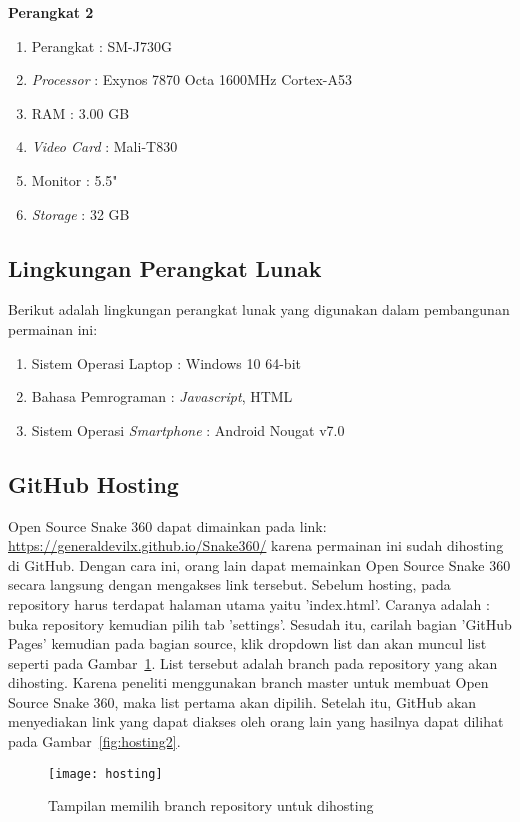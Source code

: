 \textbf{Perangkat 2}
\begin{enumerate}
	\item Perangkat : SM-J730G
	\item \textit{Processor} : Exynos 7870 Octa 1600MHz Cortex-A53
	\item RAM : 3.00 GB
	\item \textit{Video Card} : Mali-T830
	\item Monitor : 5.5"
	\item \textit{Storage} : 32 GB
\end{enumerate}

\subsection{Lingkungan Perangkat Lunak}
Berikut adalah lingkungan perangkat lunak yang digunakan dalam pembangunan permainan ini:

\begin{enumerate}
	\item Sistem Operasi Laptop : Windows 10 64-bit
	\item Bahasa Pemrograman : \textit{Javascript}, HTML
	\item Sistem Operasi \textit{Smartphone} : Android Nougat v7.0
\end{enumerate}

\subsection{GitHub Hosting}
Open Source Snake 360 dapat dimainkan pada link: \url{https://generaldevilx.github.io/Snake360/} karena permainan ini sudah dihosting di GitHub. Dengan cara ini, orang lain dapat memainkan Open Source Snake 360 secara langsung dengan mengakses link tersebut. Sebelum hosting, pada repository harus terdapat halaman utama yaitu 'index.html'. Caranya adalah : buka repository kemudian pilih tab 'settings'. Sesudah itu, carilah bagian 'GitHub Pages' kemudian pada bagian source, klik dropdown list dan akan muncul list seperti pada Gambar~\ref{fig:hosting}. List tersebut adalah branch pada repository yang akan dihosting. Karena peneliti menggunakan branch master untuk membuat Open Source Snake 360, maka list pertama akan dipilih. Setelah itu, GitHub akan menyediakan link yang dapat diakses oleh orang lain yang hasilnya dapat dilihat pada Gambar~\ref{fig:hosting2}.

\begin{figure}[H]
	\centering  
	\texttt{[image: hosting]}  
	\caption[Tampilan memilih branch repository untuk dihosting]{Tampilan memilih branch repository untuk dihosting}
	\label{fig:hosting} 
\end{figure}

